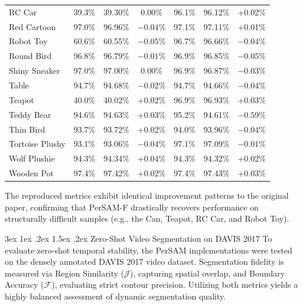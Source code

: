\documentclass[journal,12pt,onecolumn,draftclsnofoot]{IEEEtran}
\makeatletter
\renewcommand{\subsection}{\@startsection{subsection}{2}{\z@}%
    {3ex \@plus 1ex \@minus .2ex}%
    {1.5ex \@plus.2ex}%
    {\normalfont\large\bfseries}}
\makeatother
\begin{document}
\begin{longtable}{l c c c c c c}
RC Car & 39.3\% & 39.30\% & 0.00\% & 96.1\% & 96.12\% & +0.02\% \\
Red Cartoon & 97.0\% & 96.96\% & $-0.04\%$ & 97.1\% & 97.11\% & +0.01\% \\
Robot Toy & 60.6\% & 60.55\% & $-0.05\%$ & 96.7\% & 96.66\% & $-0.04\%$ \\
Round Bird & 96.8\% & 96.79\% & $-0.01\%$ & 96.9\% & 96.85\% & $-0.05\%$ \\
Shiny Sneaker & 97.0\% & 97.00\% & 0.00\% & 96.9\% & 96.87\% & $-0.03\%$ \\
Table & 94.7\% & 94.68\% & $-0.02\%$ & 94.7\% & 94.66\% & $-0.04\%$ \\
Teapot & 40.0\% & 40.02\% & +0.02\% & 96.9\% & 96.93\% & +0.03\% \\
Teddy Bear & 94.6\% & 94.63\% & +0.03\% & 95.2\% & 94.61\% & $-0.59\%$ \\
Thin Bird & 93.7\% & 93.72\% & +0.02\% & 94.0\% & 93.96\% & $-0.04\%$ \\
Tortoise Plushy & 93.1\% & 93.06\% & $-0.04\%$ & 97.1\% & 97.09\% & $-0.01\%$ \\
Wolf Plushie & 94.3\% & 94.34\% & +0.04\% & 94.3\% & 94.32\% & +0.02\% \\
Wooden Pot & 97.4\% & 97.42\% & +0.02\% & 97.4\% & 97.43\% & +0.03\% \\
\end{longtable}
\normalsize

The reproduced metrics exhibit identical improvement patterns to the original paper, confirming that PerSAM-F drastically recovers performance on structurally difficult samples (e.g., the Can, Teapot, RC Car, and Robot Toy).

\subsection{Zero-Shot Video Segmentation on DAVIS 2017}
To evaluate zero-shot temporal stability, the PerSAM implementations were tested on the densely annotated DAVIS 2017 video dataset. Segmentation fidelity is measured via Region Similarity ($\mathcal{J}$), capturing spatial overlap, and Boundary Accuracy ($\mathcal{F}$), evaluating strict contour precision. Utilizing both metrics yields a highly balanced assessment of dynamic segmentation quality.
\end{document}
